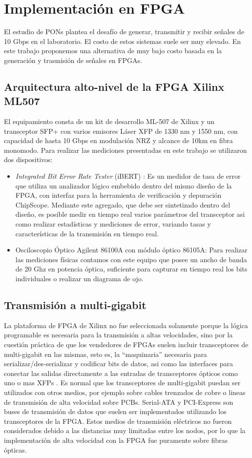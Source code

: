 \section{Implementación en FPGA}
El estudio de PONs plantea el desafío de generar, transmitir y recibir
señales de 10 Gbps en el laboratorio. El costo de estos sistemas
suele ser muy elevado. En este trabajo proponemos una alternativa de muy
bajo costo basada en la generación y trasmisión de señales en FPGAs.

\subsection{Arquitectura alto-nivel de la FPGA Xilinx ML507}
El equipamiento consta de un kit de desarrollo ML-507 de Xilinx y un
transceptor SFP+ con varios emisores Láser XFP de 1330 nm y 1550 nm, con capacidad de hasta 10 Gbps
en modulación NRZ y alcance de 10km en fibra monomodo. Para realizar
las mediciones presentadas en este trabajo se utilizaron dos dispositivos:
\begin{itemize}
 \item {\em Integrated Bit Error Rate Tester} (iBERT) \cite{4gtxs}: Es
un medidor de tasa de error que utiliza un analizador lógico embebido dentro
del mismo diseño de la FPGA, con interfaz para la herramienta de
verificación y depuración ChipScope. Mediante este agregado, que debe
ser sintetizado dentro del diseño, es posible medir en tiempo real
varios parámetros del transceptor asi como realizar estadísticas y
mediciones de error, variando tasas y características de la transmisión
en tiempo real.
 \item Osciloscopio Óptico Agilent 86100A con módulo óptico 86105A: Para
realizar las mediciones físicas contamos con este equipo que posee un
ancho de banda de 20 Ghz en potencia óptica, suficiente para capturar en
tiempo real los bits individuales o realizar un diagrama de ojo.
\end{itemize}
\subsection{Transmisión a multi-gigabit}
La plataforma de FPGA de Xilinx no fue seleccionada solamente porque la lógica programable es necesaria para la transmisión a altas velocidades, sino por la cuestión práctica de que los vendedores de FPGAs suelen incluir transceptores de multi-gigabit en las mismas, esto es, la ``maquinaria'' necesaria para serializar/des-serializar y codificar bits de datos, asi como las interfaces para conectar las salidas directamente a las entradas de transceptores ópticos como uno o mas XFPs \cite{ug198}.
Es normal que los transceptores de multi-gigabit puedan ser utilizados con otros medios, por ejemplo sobre cables trenzados de cobre o lineas de transmisión de alta velocidad sobre PCBs. Serial-ATA y PCI-Express son buses de transmisión de datos que suelen ser implementados utilizando los transceptores de la FPGA. Estos medios de transmisión eléctricos no fueron considerados debido a las distancias muy limitadas entre los nodos, por lo que la implementación de alta velocidad con la FPGA fue puramente sobre fibras ópticas.

